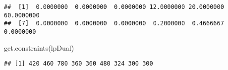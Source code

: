 \documentclass[
]{article}
\newenvironment{Shaded}{\begin{snugshade}}{\end{snugshade}}
\newcommand{\FunctionTok}[1]{\textcolor[rgb]{0.00,0.00,0.00}{#1}}
\newcommand{\NormalTok}[1]{#1}
\begin{document}
\begin{verbatim}
##  [1]  0.0000000  0.0000000  0.0000000 12.0000000 20.0000000 60.0000000
##  [7]  0.0000000  0.0000000  0.0000000  0.2000000  0.4666667  0.0000000
\end{verbatim}

\begin{Shaded}
\begin{Highlighting}[]
\FunctionTok{get.constraints}\NormalTok{(lpDual) }
\end{Highlighting}
\end{Shaded}

\begin{verbatim}
## [1] 420 460 780 360 360 480 324 300 300
\end{verbatim}
\end{document}
